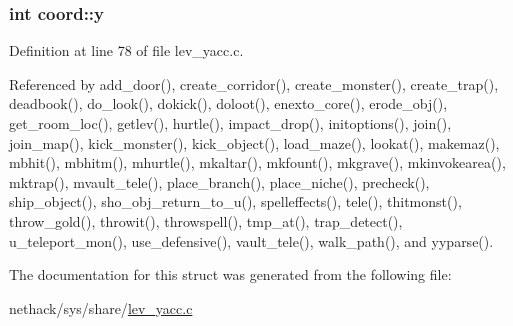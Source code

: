 \hypertarget{structcoord_a2b099692d87f98e4844b615136ca37fb}{
\subsubsection[{y}]{\setlength{\rightskip}{0pt plus 5cm}int coord\+::y}}\label{structcoord_a2b099692d87f98e4844b615136ca37fb}


Definition at line 78 of file lev\+\_\+yacc.\+c.



Referenced by add\+\_\+door(), create\+\_\+corridor(), create\+\_\+monster(), create\+\_\+trap(), deadbook(), do\+\_\+look(), dokick(), doloot(), enexto\+\_\+core(), erode\+\_\+obj(), get\+\_\+room\+\_\+loc(), getlev(), hurtle(), impact\+\_\+drop(), initoptions(), join(), join\+\_\+map(), kick\+\_\+monster(), kick\+\_\+object(), load\+\_\+maze(), lookat(), makemaz(), mbhit(), mbhitm(), mhurtle(), mkaltar(), mkfount(), mkgrave(), mkinvokearea(), mktrap(), mvault\+\_\+tele(), place\+\_\+branch(), place\+\_\+niche(), precheck(), ship\+\_\+object(), sho\+\_\+obj\+\_\+return\+\_\+to\+\_\+u(), spelleffects(), tele(), thitmonst(), throw\+\_\+gold(), throwit(), throwspell(), tmp\+\_\+at(), trap\+\_\+detect(), u\+\_\+teleport\+\_\+mon(), use\+\_\+defensive(), vault\+\_\+tele(), walk\+\_\+path(), and yyparse().



The documentation for this struct was generated from the following file\+:\begin{DoxyCompactItemize}
\item 
nethack/sys/share/\hyperlink{lev__yacc_8c}{lev\+\_\+yacc.\+c}\end{DoxyCompactItemize}
